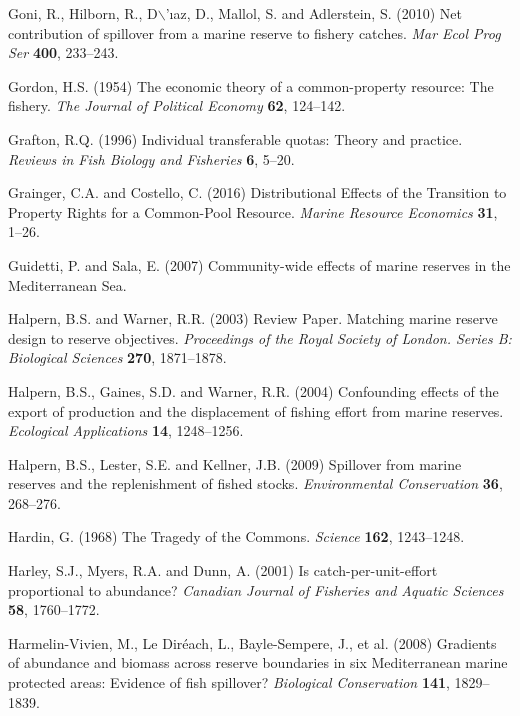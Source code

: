 \documentclass[twoside,12pt,final]{ucthesis-CA2012}
\begin{document}
\begin{ucmainmatter}
\hypertarget{ref-Goni2010}{}
Goni, R., Hilborn, R., D\(\backslash\)'ıaz, D., Mallol, S. and
Adlerstein, S. (2010) Net contribution of spillover from a marine
reserve to fishery catches. \emph{Mar Ecol Prog Ser} \textbf{400},
233--243.

\hypertarget{ref-Gordon1954}{}
Gordon, H.S. (1954) The economic theory of a common-property resource:
The fishery. \emph{The Journal of Political Economy} \textbf{62},
124--142.

\hypertarget{ref-Grafton1996}{}
Grafton, R.Q. (1996) Individual transferable quotas: Theory and
practice. \emph{Reviews in Fish Biology and Fisheries} \textbf{6},
5--20.

\hypertarget{ref-Grainger2016}{}
Grainger, C.A. and Costello, C. (2016) Distributional Effects of the
Transition to Property Rights for a Common-Pool Resource. \emph{Marine
Resource Economics} \textbf{31}, 1--26.

\hypertarget{ref-Guidetti2007a}{}
Guidetti, P. and Sala, E. (2007) Community-wide effects of marine
reserves in the Mediterranean Sea.

\hypertarget{ref-Halpern2003}{}
Halpern, B.S. and Warner, R.R. (2003) Review Paper. Matching marine
reserve design to reserve objectives. \emph{Proceedings of the Royal
Society of London. Series B: Biological Sciences} \textbf{270},
1871--1878.

\hypertarget{ref-Halpern2004}{}
Halpern, B.S., Gaines, S.D. and Warner, R.R. (2004) Confounding effects
of the export of production and the displacement of fishing effort from
marine reserves. \emph{Ecological Applications} \textbf{14}, 1248--1256.

\hypertarget{ref-Halpern2009}{}
Halpern, B.S., Lester, S.E. and Kellner, J.B. (2009) Spillover from
marine reserves and the replenishment of fished stocks.
\emph{Environmental Conservation} \textbf{36}, 268--276.

\hypertarget{ref-Hardin1968}{}
Hardin, G. (1968) The Tragedy of the Commons. \emph{Science}
\textbf{162}, 1243--1248.

\hypertarget{ref-Harley2001}{}
Harley, S.J., Myers, R.A. and Dunn, A. (2001) Is catch-per-unit-effort
proportional to abundance? \emph{Canadian Journal of Fisheries and
Aquatic Sciences} \textbf{58}, 1760--1772.

\hypertarget{ref-Harmelin-Vivien2008}{}
Harmelin-Vivien, M., Le Diréach, L., Bayle-Sempere, J., et al. (2008)
Gradients of abundance and biomass across reserve boundaries in six
Mediterranean marine protected areas: Evidence of fish spillover?
\emph{Biological Conservation} \textbf{141}, 1829--1839.


\end{ucmainmatter}
\end{document}
